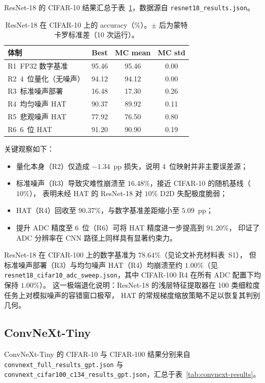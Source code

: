ResNet-18 的 CIFAR-10 结果汇总于表~\ref{tab:resnet18-cifar10}，数据源自 \texttt{resnet18\_results.json}。

\begin{table}[htbp]
\centering
\caption{ResNet-18 在 CIFAR-10 上的 accuracy（\%）。$\pm$ 后为蒙特卡罗标准差（10 次运行）。}
\label{tab:resnet18-cifar10}
\begin{tabular}{@{}lccc@{}}
\toprule
\textbf{体制} & \textbf{Best} & \textbf{MC mean} & \textbf{MC std} \\
\midrule
R1~FP32 数字基准 & 95.46 & 95.46 & 0.00 \\
R2~4~位量化（无噪声） & 94.12 & 94.12 & 0.00 \\
R3~标准噪声部署 & 16.48 & 17.30 & 0.26 \\
R4~均匀噪声 HAT & 90.37 & 89.92 & 0.11 \\
R5~悲观噪声 HAT & 77.92 & 76.50 & 0.80 \\
R6~6~位 HAT & 91.20 & 90.90 & 0.19 \\
\bottomrule
\end{tabular}
\end{table}

关键观察如下：
\begin{itemize}
    \item 量化本身（R2）仅造成 $-1.34$~pp 损失，说明 4~位映射并非主要误差源；
    \item 标准噪声（R3）导致灾难性崩溃至 $16.48\%$，接近 CIFAR-10 的随机基线（$10\%$），
    表明未经 HAT 的 ResNet-18 对 $10\%$ D2D 失配极度脆弱；
    \item HAT（R4）回收至 $90.37\%$，与数字基准差距缩小至 $5.09$~pp；
    \item 提升 ADC 精度至 6~位（R6）可将 HAT 精度进一步提高到 $91.20\%$，
    印证了 ADC 分辨率在 CNN 路径上同样具有显著约束力。
\end{itemize}

ResNet-18 在 CIFAR-100 上的数字基准为 $78.64\%$（见论文补充材料表~S1），
但标准噪声部署（R3）与均匀噪声 HAT（R4）均崩溃至约 $1.00\%$（见 \texttt{resnet18\_cifar10\_adc\_sweep.json}，其中 CIFAR-100 R4 在所有 ADC 配置下均保持 $1.00\%$）。
这一极端退化说明：ResNet-18 的浅层特征提取器在 100 类细粒度任务上对模拟噪声的容错窗口极窄，
HAT 的常规梯度缩放策略不足以恢复其判别几何。

\subsection{ConvNeXt-Tiny}

ConvNeXt-Tiny 的 CIFAR-10 与 CIFAR-100 结果分别来自 \texttt{convnext\_full\_results\_gpt.json} 与 \texttt{convnext\_cifar100\_c134\_results\_gpt.json}，汇总于表~\ref{tab:convnext-results}。

